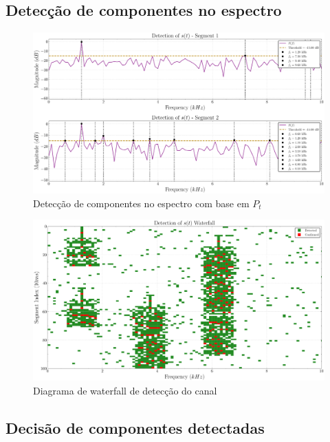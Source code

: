 \subsection{Detecção de componentes no espectro}\label{sec:comparacao_potencia}

\begin{figure}[H]
	\centering
	\caption{Detecção de componentes no espectro com base em $P_t$}\label{fig:freq_detection}
	\includegraphics[width=\linewidth]{assets/cap3/example_detector_freq.pdf}
\end{figure}

\begin{figure}[H]
	\centering
	\caption{Diagrama de waterfall de detecção do canal}\label{fig:waterfall_detection}
	\includegraphics[width=\linewidth]{assets/cap3/example_detector_waterfall_detection.pdf}
\end{figure}


\subsection{Decisão de componentes detectadas}\label{sec:decisao}


